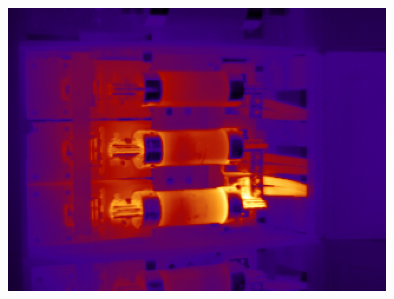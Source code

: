\documentclass[12pt,twoside,a4paper,titlepage]{report}
\begin{document}
\begin{figure}[ht]
 \centering
 \includegraphics[width=10cm, keepaspectratio=true width=10cm]{img/FLIR_P60_orig}

\end{figure}
\end{document}
